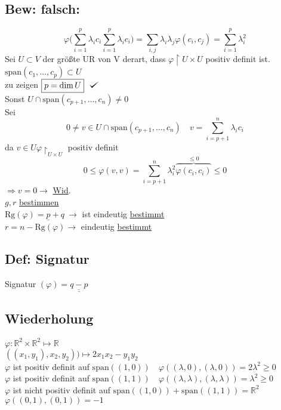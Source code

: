 \documentclass[titlepage,12pt,a4paper,ngerman]{report}
\def\checkmark{\tikz\fill[scale=0.4](0,.35) -- (.25,0) -- (1,.7) -- (.25,.15) -- cycle;}
\newcommand{\tx}[1]{\textrm{#1}}
\newcommand{\ob}[1]{\overbrace{#1}}
\newcommand{\spa}{\tx{span}}
\begin{document}
\subsection{Bew: falsch:}
$$\varphi\bigg( \sum_{i=1}^{p} \lambda_i c_i \sum_{i=1}^{p} \lambda_i c_i\bigg) = \sum_{i,j} \lambda_i \lambda_j \varphi(c_i,c_j) = \sum_{i=1}^{p} \lambda_i^2$$
Sei $ U\subset V $ der größte UR von V derart, dass $ \varphi \upharpoonright U \times U $ positiv definit ist.\\
$ \spa(c_1,\dots,c_p) \subset U $\\
zu zeigen $ \boxed{p = \dim U} \ \ \checkmark$ \\
Sonst $ U \cap \spa (c_{p+1}, \dots , c_n) \neq 0  $\\
Sei $$ 0 \neq  v \in U \cap \spa (c_{p+1},\dots , c_n) \quad v = \sum_{i=p+1}^{n} \lambda_i c_i$$
da $ v \in U \varphi\upharpoonright _{U\times U} $ positiv definit
$$ 0 \le \varphi(v,v) = \sum_{i=p+1}^{n} \lambda_i^2 \ob{\varphi(c_i,c_i)}^{\le 0} \le 0$$
$ \Rightarrow v = 0 \rightarrow $ \underline{Wid}.\\
$ g,r $ \underline{bestimmen}\\
$ \tx{Rg}(\varphi) = \underline{p} + q  \ \rightarrow $ ist eindeutig \underline{bestimmt}\\
$ r = n - \tx{Rg}(\varphi) \rightarrow $ eindeutig \underline{bestimmt}

\subsection{Def: Signatur}
Signatur $ (\varphi) = \underline{\underline{q-p}} $



\subsection{Wiederholung}
$ \varphi: \mathbb{R}^2 \times \mathbb{R}^2 \mapsto \mathbb{R} $\\
$ ((x_1,y_1), x_2,y_2) ) \mapsto 2 x_1x_2 - y_1 y_2 $\\
$ \varphi $ ist positiv definit auf $ \spa ((1,0)) \quad \varphi((\lambda,0),(\lambda,0)) = 2 \lambda^2 \ge 0$\\
$ \varphi $ ist positiv definit auf $ \spa((1,1)) \quad \varphi((\lambda,\lambda),(\lambda,\lambda)) = \lambda^2 \ge 0 $\\
$ \varphi $ ist nicht positiv definit auf $ \spa((1,0)) + \spa((1,1)) = \mathbb{R}^2$\\
$\varphi((0,1),(0,1)) = -1 $
\end{document}
